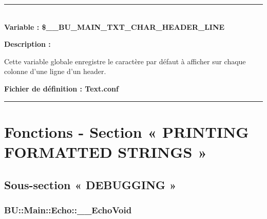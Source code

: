 \documentclass[a4paper,10pt]{article}
\begin{document}



\color{vars}\par\noindent\rule{\textwidth}{0.4pt}\color{text}\\[1\baselineskip]

\textbf{Variable : \color{vars}\$\_\_BU\_MAIN\_TXT\_CHAR\_HEADER\_LINE}\\[1\baselineskip]

\setlength{\parskip}{2em}

\begin{justify}
    \textbf{Description :}
\end{justify}

\setlength{\parskip}{1em}

\begin{justify}
    Cette variable globale enregistre le caractère par défaut à afficher sur chaque colonne d'une ligne d'un header.
\end{justify}

\textbf{Fichier de définition : \color{path}Text.conf}\\[1\baselineskip]





\color{sec1}\par\noindent\rule{\textwidth}{0.4pt}\color{text}

\color{sec1}
\section{Fonctions - Section « PRINTING FORMATTED STRINGS »}\color{text}

\color{sec2}
\subsection{Sous-section « DEBUGGING »}\color{text}

\color{sec3}
\subsubsection{BU::Main::Echo::\_\_EchoVoid}\color{text}
\end{document}
